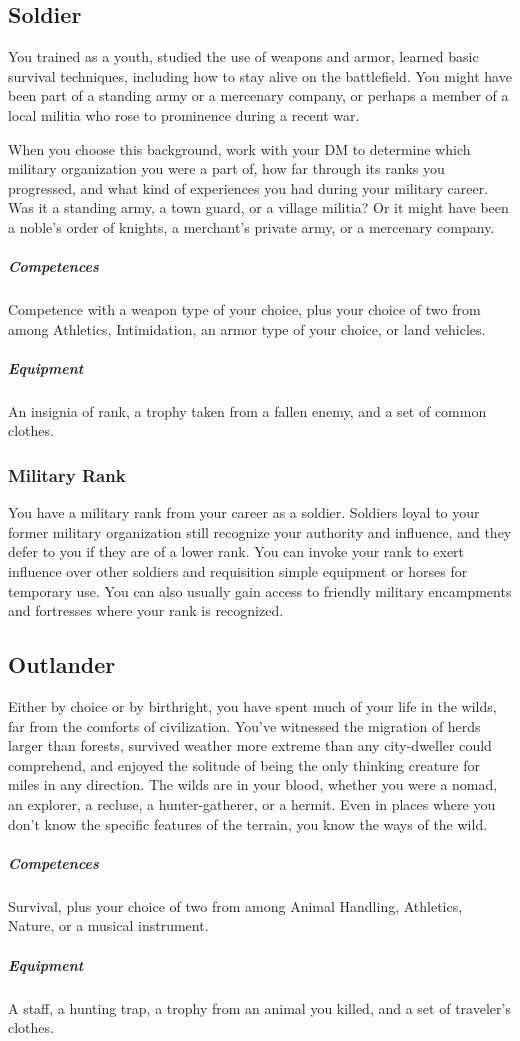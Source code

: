 \subsection*{Soldier} \label{ssec::soldier}
    You trained as a youth, studied the use of weapons and armor, learned basic survival techniques, including how to stay alive on the battlefield.
    You might have been part of a standing army or a mercenary company, or perhaps a member of a local militia who rose to prominence during a recent war.

    When you choose this background, work with your DM to determine which military organization you were a part of, how far through its ranks you progressed, and what kind of experiences you had during your military career.
    Was it a standing army, a town guard, or a village militia?
    Or it might have been a noble's order of knights, a merchant's private army, or a mercenary company.
    \subparagraph{Competences} Competence with a weapon type of your choice, plus your choice of two from among Athletics, Intimidation, an armor type of your choice, or land vehicles.
    \subparagraph{Equipment} An insignia of rank, a trophy taken from a fallen enemy, and a set of common clothes.
    \subsubsection{Military Rank}
        You have a military rank from your career as a soldier.
        Soldiers loyal to your former military organization still recognize your authority and influence, and they defer to you if they are of a lower rank.
        You can invoke your rank to exert influence over other soldiers and requisition simple equipment or horses for temporary use.
        You can also usually gain access to friendly military encampments and fortresses where your rank is recognized.

\subsection*{Outlander} \label{ssec::outlander}
    Either by choice or by birthright, you have spent much of your life in the wilds, far from the comforts of civilization.
    You've witnessed the migration of herds larger than forests, survived weather more extreme than any city-dweller could comprehend, and enjoyed the solitude of being the only thinking creature for miles in any direction.
    The wilds are in your blood, whether you were a nomad, an explorer, a recluse, a hunter-gatherer, or a hermit.
    Even in places where you don't know the specific features of the terrain, you know the ways of the wild.
    \subparagraph{Competences} Survival, plus your choice of two from among Animal Handling, Athletics, Nature, or a musical instrument.
    \subparagraph{Equipment} A staff, a hunting trap, a trophy from an animal you killed, and a set of traveler's clothes.
